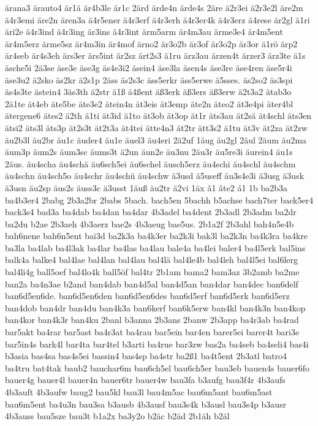 {ärana3
ärauto4
är1ä
är4b3le
är1c
2ärd
ärde4n
ärde4s
2äre
ä2r3ei
ä2r3e2l
äre2m
ä4r3emi
äre2n
ären3a
ä4r5ener
ä4r3erf
ä4r3erh
ä4r3er4k
ä4r3erz
ä4rese
är2gl
ä1ri
äri2e
ä4r3ind
ä4r3ing
är3ins
ä4r3int
ärm5arm
är4m3au
ärme3e4
är4m5ent
är4m5erz
ärme5sz
är4m3in
är4mof
ärno2
är3o2b
är3of
är3o2p
är3or
ä1rö
ärp2
är4seb
är4s3eh
ärs3er
ärs5int
är2sz
ärt2s3
ä1ru
ärz3au
ärzen4t
ärzer3
ärz3te
ä1s
äsche5i
2ä3se
äse3e
äse3g
äs4e3i2
äsein4
äse3la
äsen4s
äse3re
äse4ren
äse5r4i
äse3u2
ä2sko
äs2kr
ä2s1p
2äss
äs2s3c
äss5erkr
äss5erwe
ä5sses.
äs2so2
äs3spi
äs4s3te
ästein4
3äs3th
ä2str
ä1ß
ä4ßent
äß3erk
äß3ers
äß3erw
ä2t3a2
ätab3o
2ä1te
ät4eb
äte5be
äte3e2
ätein4n
ät3eis
ät3emp
äte2n
äteo2
ät3e4pi
äter4bl
ätergene6
ätes2
ä2th
ä1ti
ät3id
ä1to
ät3ob
ät3op
ät1r
äts3au
ät2sä
ät4schl
äts3en
ätsi2
äts3l
äts3p
ät2s3t
ät2t3a
ät4tei
ätte4n3
ät2tr
ätt3s2
ä1tu
ät3v
ät2za
ät2zw
äu2b3l
äu2br
äu1c
äuder4
äu1e
äuel3
äu4eri
2ä2uf
1äug
äu2gl
2äul
2äum
äu2ma
äum3p
äum2s
äum3sc
äums3t
ä2un
äun2e
äu3nu
2äu3r
äu5re3i
äurein4
äu1s
2äus.
äu4scha
äu4schä
äu6sch5ei
äu6schel
äusch5erz
äu4schi
äu4schl
äu4schm
äu4schn
äu4sch5o
äu4schr
äu4schü
äu4schw
ä3usd
ä5useff
äu3s4e3i
ä3usg
ä3usk
ä3usn
äu2sp
äus2s
äuss3c
ä3usst
1äuß
äu2tr
ä2vi
1äx
â1
âte2
á1
1b
ba2b3a
ba4b3er4
2babg
2b3a2br
2babs
5bach.
bach5en
5bachh
b5achse
bach7ter
back5er4
back3s4
bad3a
ba4dab
ba4dan
ba4dar
4b3adel
ba4dent
2b3adl
2b3adm
ba2dr
ba2du
b2ae
2b3aeh
4b3aerz
bae2s
4b3aeug
bae5us.
2b1a2f
2b3ahl
bah4n5e4b
bah6nene
bah6n5ent
bai3d
ba2k3a
ba4k3er
ba2k3i
bak3l
ba2k3n
ba4k3ra
ba4kre
ba3la
ba4lab
ba4l3ak
ba4lar
ba4las
ba4lau
bale4a
ba4lei
baler4
ba4l5erk
bal5ins
balk4a
balke4
bal4lae
bal4lan
bal4lau
bal4lä
bal4le4b
bal4leh
bal4l5ei
bal6lerg
bal4li4g
ball5oef
bal4lo4k
ball5öf
bal4tr
2b1am
bama2
bam3az
3b2amb
ba2me
ban2a
ba4n3ae
b2and
ban4dab
ban4d5al
ban4d5an
ban4dar
ban4dec
ban6delf
ban6d5en6de.
ban6d5en6den
ban6d5en6des
ban6d5erf
ban6d5erk
ban6d5erz
ban4dob
ban4dr
ban4du
ban4k3a
ban6kerf
ban6k5erw
ban4kl
ban4k3n
ban4kop
ban4kor
ban4k3r
ban4ku
2banl
b3anna
2b3ans
2banw
2b3app
ba4r3ab
ba4rad
bar5akt
ba4rar
bar5ast
ba4r3at
ba4rau
bar5ein
bar4en
barer5ei
barer4t
bari3e
bar5in4s
bark4l
bar4ta
bar4tel
b3arti
ba4rue
bar3zw
bas2a
ba4seb
ba4seli4
bas4i
b3asia
bas4sa
bas4s5ei
bassin4
bas4sp
ba4str
ba2ß1
ba4t5ent
2b3atl
batro4
ba4tru
bat4tak
baub2
bauchar6m
bau6ch5el
bau6ch5er
bau3eb
bauen4s
bauer6fo
bauer4g
bauer4l
bauer4n
bauer6tr
bauer4w
bau3fa
b3aufg
bau3f4r
4b3aufs
4b3auft
4b3aufw
baug2
bau5kl
bau3l
bau4m5ac
bau6m5ant
bau6m5ast
bau6m5ent
ba4u3n
bau3sa
b3ausb
4b3ausf
bau3s4k
b3ausl
bau3s4p
b3ausr
4b3auss
bau5sze
bau3t
b1a2x
ba3y2o
b2äc
b2äd
2b1äh
b2äl
}

